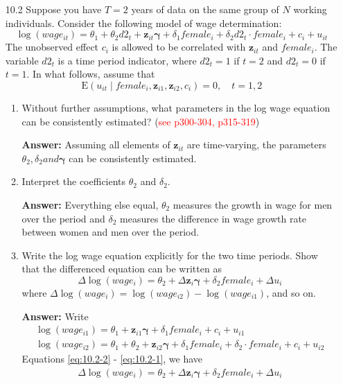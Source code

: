 \documentclass[UTF8]{article} %
\begin{document}
\begin{enumerate}
    \item[10.2] Suppose you have $T=2$ years of data on the same group of $N$ working individuals. Consider the following model of wage determination:
    \[ \log \left(wage_{it}\right)=\theta_{1}+\theta_{2} d 2_{t}+\mathbf{z}_{i t} \bm{\gamma}+\delta_{1} female_{i}+\delta_{2} d 2_{t} \cdot female_{i}+c_{i}+u_{i t} \]
    The unobserved effect $c_{i}$ is allowed to be correlated with $\mathbf{z}_{i t}$ and $female_{i}$. The variable $d 2_{t}$ is a time period indicator, where $d 2_{t}=1$ if $t=2$ and $d 2_{t}=0$ if $t=1$. In what follows, assume that
    \[ \mathrm{E}\left(u_{i t} \mid female_{i}, \mathbf{z}_{i 1}, \mathbf{z}_{i 2}, c_{i}\right)=0, \quad t=1,2 \]
    
    \begin{enumerate}
        \item Without further assumptions, what parameters in the log wage equation can be consistently estimated? (\textcolor{red}{see p300-304, p315-319})
        
        \textbf{Answer:} Assuming all elements of $\mathbf{z}_{it}$ are time-varying, the parameters $\theta_2, \delta_2 and \mathbf{\gamma}$ can be consistently estimated.
        
        \item Interpret the coefficients $\theta_{2}$ and $\delta_{2}$.
        
        \textbf{Answer:} Everything else equal, $\theta_2$ measures the growth in wage for men over the period and $\delta_2$ measures the difference in wage growth rate between women and men over the period.
        
        \item Write the log wage equation explicitly for the two time periods. Show that the differenced equation can be written as
        \[ \Delta \log \left(wage_{i}\right)=\theta_{2}+\Delta \mathbf{z}_{i} \bm{\gamma}+\delta_{2} female_{i}+\Delta u_{i} \]
        where $\Delta \log \left( wage_{i}\right)=\log \left(wage_{i 2}\right)-\log \left(wage_{i 1}\right)$, and so on.
        
        \textbf{Answer:} Write
        \begin{gather}
            \log \left(wage_{i1}\right)=\theta_{1}+\mathbf{z}_{i1} \bm{\gamma}+\delta_{1} female_{i}+c_{i}+u_{i1} \label{eq:10.2-1} \\
            \log \left(wage_{i2}\right)=\theta_{1}+\theta_{2}+\mathbf{z}_{i 2} \bm{\gamma}+\delta_{1} female_{i}+\delta_{2} \cdot female_{i}+c_{i}+u_{i2} \label{eq:10.2-2}
        \end{gather}
        Equations \eqref{eq:10.2-2} - \eqref{eq:10.2-1}, we have
        \begin{gather}
            \Delta \log \left(wage_{i}\right)=\theta_{2}+\Delta \mathbf{z}_{i} \bm{\gamma}+\delta_{2} female_{i}+\Delta u_{i} \label{eq:10.2-3}
        \end{gather}
        

\end{enumerate}
\end{enumerate}
\end{document}
